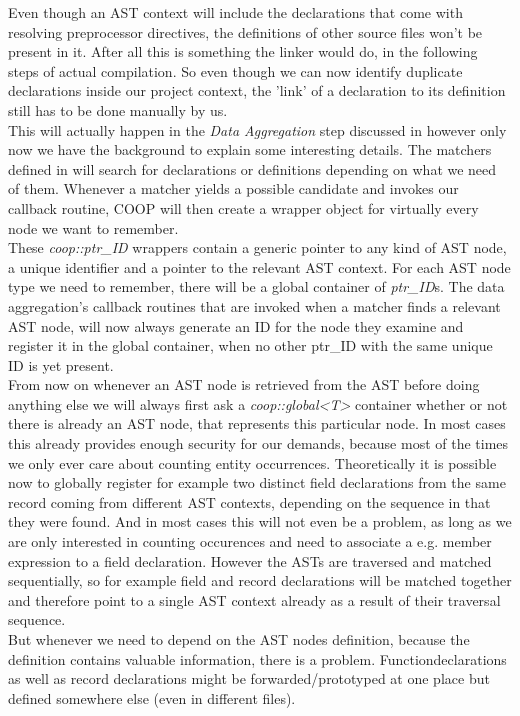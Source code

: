Even though an AST context will include the declarations that come with resolving preprocessor directives, the definitions of other source files won't be present in it. After all this is something the linker would do, in the following steps of actual compilation. So even though we can now identify duplicate declarations inside our project context, the 'link' of a declaration to its definition still has to be done manually by us.\\
This will actually happen in the \textit{Data Aggregation} step discussed in  however only now we have the background to explain some interesting details. The matchers defined in  will search for declarations or definitions depending on what we need of them. Whenever a matcher yields a possible candidate and invokes our callback routine, COOP will then create a wrapper object for virtually every node we want to remember.\\
These \textit{coop::ptr\_ID} wrappers contain a generic pointer to any kind of AST node, a unique identifier and a pointer to the relevant AST context. For each AST node type we need to remember, there will be a global container of \textit{ptr\_ID}s. The data aggregation's callback routines that are invoked when a matcher finds a relevant AST node, will now always generate an ID for the node they examine and register it in the global container, when no other ptr\_ID with the same unique ID is yet present.\\
From now on whenever an AST node is retrieved from the AST before doing anything else we will always first ask a \textit{coop::global<T>} container whether or not there is already an AST node, that represents this particular node. In most cases this already provides enough security for our demands, because most of the times we only ever care about counting entity occurrences. Theoretically it is possible now to globally register for example two distinct field declarations from the same record coming from different AST contexts, depending on the sequence in that they were found. And in most cases this will not even be a problem, as long as we are only interested in counting occurences and need to associate a e.g. member expression to a field declaration. However the ASTs are traversed and matched sequentially, so for example field and record declarations will be matched together and therefore point to a single AST context already as a result of their traversal sequence.\\
But whenever we need to depend on the AST nodes definition, because the definition contains valuable information, there is a problem. Functiondeclarations as well as record declarations might be forwarded/prototyped at one place but defined somewhere else (even in different files).\\\\
